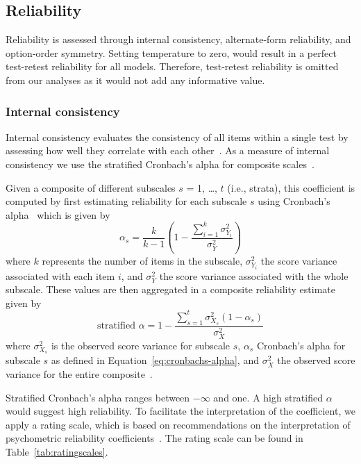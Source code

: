 \documentclass{DESSThesis}
\begin{document}
\subsection{Reliability}

Reliability is assessed through internal consistency, alternate-form reliability, and option-order symmetry. Setting temperature to zero, would result in a perfect test-retest reliability for all models. Therefore, test-retest reliability is omitted from our analyses as it would not add any informative value.


\subsubsection{Internal consistency}

Internal consistency evaluates the consistency of all items within a single test by assessing how well they correlate with each other~\cite{rammstedt_reliabilitat_2010}. As a measure of internal consistency we use the stratified Cronbach's alpha for composite scales~\cite{cronbach_alpha_1965, meyer_reliability_2010}. 

Given a composite of different subscales $s$ = 1, …, $t$ (i.e., strata), this coefficient is computed by first estimating reliability for each subscale $s$ using Cronbach's alpha~\cite{cronbach_coefficient_1951} which is given by  
\begin{equation}
	\alpha_s = \frac{k}{k - 1} \left( 1 - \frac{\sum_{i=1}^{k} \sigma^2_{Y_i}}{\sigma^2_Y} \right)
	\label{eq:cronbachs-alpha}
\end{equation}
where $k$ represents the number of items in the subscale, $\sigma^2_{Y_i}$ the score variance associated with each item $i$, and $\sigma^2_Y$ the score variance associated with the whole subscale. 
These values are then aggregated in a composite reliability estimate given by
\begin{equation}
	\text{stratified } \alpha = 1-\frac{\sum_{s=1}^{t} \sigma^2_{X_s}(1-\alpha_s)}{\sigma^2_X}
\end{equation}
where $\sigma^2_{X_s}$ is the observed score variance for subscale $s$, $\alpha_s$ Cronbach's alpha for subscale $s$ as defined in Equation~\ref{eq:cronbachs-alpha}, and $\sigma^2_X$ the observed score variance for the entire composite~\cite{meyer_reliability_2010}.

Stratified Cronbach's alpha ranges between $-\infty$ and one.
A high stratified $\alpha$ would suggest high reliability.
To facilitate the interpretation of the coefficient, we apply a rating scale, which is based on recommendations on the interpretation of psychometric reliability coefficients~\cite{moosbrugger_testtheorie_2020, rammstedt_reliabilitat_2010}. The rating scale can be found in Table~\ref{tab:ratingscales}. 
\end{document}
